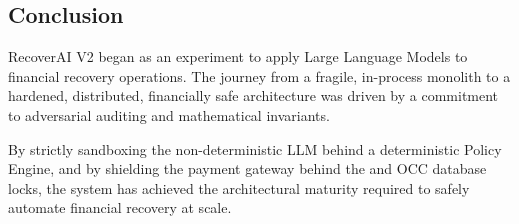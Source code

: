 \vspace{0.8cm}

\subsection{Conclusion}

RecoverAI V2 began as an experiment to apply Large Language Models to financial recovery operations. The journey from a fragile, in-process monolith to a hardened, distributed, financially safe architecture was driven by a commitment to adversarial auditing and mathematical invariants.

By strictly sandboxing the non-deterministic LLM behind a deterministic Policy Engine, and by shielding the payment gateway behind the  and OCC database locks, the system has achieved the architectural maturity required to safely automate financial recovery at scale.
